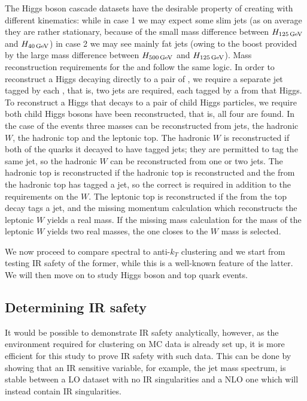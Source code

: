     The Higgs boson cascade datasets have the desirable property of creating  with different kinematics: while in case 1 we may expect some slim  jets (as on average they are rather stationary, because of the small mass difference between $H_{125\,{\rm GeV}}$ and $H_{40\,{\rm GeV}}$)
in case 2 we may see mainly fat jets (owing to the boost provided by the large mass difference between $H_{500\,{\rm GeV}}$ and $H_{125\,{\rm GeV}}$).
Mass reconstruction requirements for the  and  follow the same logic.
In order to reconstruct a Higgs decaying directly to a pair of , we require a separate jet tagged by each , that is, two jets are required, each tagged by a  from that Higgs.
To reconstruct a Higgs that decays to a pair of child Higgs particles,
we require both child Higgs bosons have been reconstructed,
that is, all four  are found.
In the case of the  events
three masses can be reconstructed from jets, the hadronic \(W\),
the hadronic top and the leptonic top.
The hadronic \(W\) is reconstructed if both of the quarks it decayed to have tagged jets; they are permitted to tag the same jet, so the hadronic \(W\) can be reconstructed from one or two jets.
The hadronic top is reconstructed if the hadronic top is reconstructed and the  from the hadronic top has tagged a jet, so the correct  is required in addition to the requirements on the \(W\).
The leptonic top is reconstructed if the  from the top decay tags a jet, and the missing momentum calculation which reconstructs the leptonic \(W\) yields a real mass.
If the missing mass calculation for the mass of the leptonic \(W\) yields two real masses, the one closes to the \(W\) mass is selected.

We now proceed to compare spectral to anti-$k_T$ clustering and we start from testing IR safety of the former, while this is a well-known feature of the latter. We will then move on to study Higgs boson and top quark events.


\subsection{Determining IR safety}\label{sec:IRmethod}
    It would be possible to demonstrate IR safety analytically, however,
    as the environment required for clustering on MC data is already set up,
    it is more efficient for this study to prove IR safety with such data.
    This can be done by showing that an IR sensitive variable, for example, the jet mass spectrum,
    is stable between a LO dataset with no IR singularities and a NLO
    one which will instead contain IR singularities.

